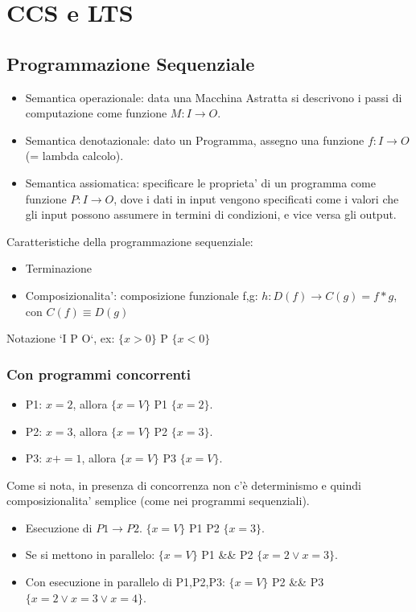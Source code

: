 \chapter{CCS e LTS}

\section{Programmazione Sequenziale}

\begin{itemize}
  \item Semantica operazionale: data una Macchina Astratta si descrivono i passi di computazione come funzione $M : I \rightarrow O$.
  \item Semantica denotazionale: dato un Programma, assegno una funzione $f : I \rightarrow O$ (= lambda calcolo).
  \item Semantica assiomatica: specificare le proprieta' di un programma come funzione $P : I \rightarrow O$, dove i dati in input vengono specificati come i valori che gli input possono assumere in termini di condizioni, e vice versa gli output.
\end{itemize}

Caratteristiche della programmazione sequenziale:
\begin{itemize}
  \item Terminazione
  \item Composizionalita': composizione funzionale f,g: $h : D(f) \rightarrow C(g) = f * g$, con $C(f) \equiv D(g)$
\end{itemize}

Notazione `I P O`, ex: $\{x>0\}$ P $\{x<0\}$

\subsection{Con programmi concorrenti}

\begin{itemize}
  \item P1: $x = 2$, allora $\{x = V\}$ P1 $\{x = 2\}$.
  \item P2: $x = 3$, allora $\{x = V\}$ P2 $\{x = 3\}$.
  \item P3: $x += 1$, allora $\{x = V\}$ P3 $\{x = V\}$.
\end{itemize}

Come si nota, in presenza di concorrenza non c'\`e determinismo e quindi composizionalita' semplice (come nei programmi sequenziali).

\begin{itemize}
  \item Esecuzione di $P1 \rightarrow P2$. $\{x = V\}$ P1 P2 $\{x = 3\}$.
  \item Se si mettono in parallelo: $\{x = V\}$ P1 \&\& P2 $\{x = 2 \lor x = 3\}$.
  \item Con esecuzione in parallelo di P1,P2,P3: $\{x = V\}$ P2 \&\& P3 $\{x = 2 \lor x = 3 \lor x = 4\}$.
\end{itemize}

